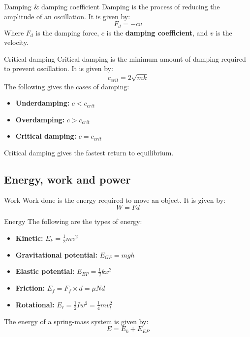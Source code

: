 \begin{definition}
    {Damping \& damping coefficient}
    Damping is the process of reducing the amplitude of an oscillation. It is given by:
    \[F_d=-cv\]
    Where $F_d$ is the damping force, $c$ is the \textbf{damping coefficient}, and $v$ is the velocity.
\end{definition}

\begin{theorem}
    {Critical damping}
    Critical damping is the minimum amount of damping required to prevent oscillation. It is given by:
    \[c_{crit}=2\sqrt{mk}\]
    The following gives the cases of damping:
    \begin{itemize}
        \item \textbf{Underdamping: }$c<c_{crit}$
        \item \textbf{Overdamping: }$c>c_{crit}$
        \item \textbf{Critical damping: }$c=c_{crit}$
    \end{itemize}
    Critical damping gives the fastest return to equilibrium.
\end{theorem}

\subsection{Energy, work and power}

\begin{definition}
    {Work}
    Work done is the energy required to move an object. It is given by:
    \[W=Fd\]
\end{definition}

\begin{theorem}
    {Energy}
    The following are the types of energy:
    \begin{itemize}
        \item \textbf{Kinetic: }$E_k=\frac{1}{2}mv^2$
        \item \textbf{Gravitational potential: }$E_{GP}=mgh$
        \item \textbf{Elastic potential: }$E_{EP}=\frac{1}{2}kx^2$
        \item \textbf{Friction: } $E_{f}=F_f\times d=\mu Nd$
        \item \textbf{Rotational: } $E_{r}=\frac{1}{2}Iw^2=\frac14mv_t^2$
    \end{itemize}
    The energy of a spring-mass system is given by:
    \[E=E_k+E_{EP}\]
\end{theorem}

